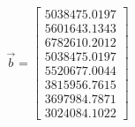 \begin{equation} \Vec{b} = \begin{bmatrix} 5038475.0197\\ 5601643.1343\\ 6782610.2012\\ 5038475.0197\\ 5520677.0044\\ 3815956.7615\\ 3697984.7871\\ 3024084.1022 \end{bmatrix} \label{eqsol} \end{equation}